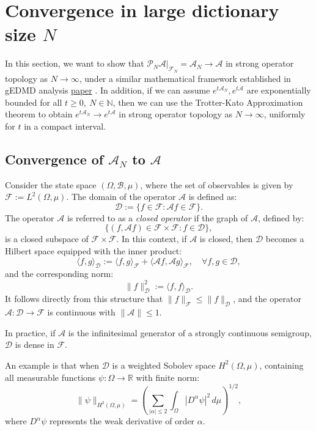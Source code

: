 \documentclass{article}[11]
\begin{document}
	\section{Convergence in large dictionary size $N$}
	In this section, we want to show that $\mathcal{P}_N\mathcal{A}|_{\mathcal{F}_N} = \mathcal{A}_N \to \mathcal{A}$ in strong operator topology as $N \to \infty$, under a similar mathematical framework established in gEDMD analysis \href{https://arxiv.org/abs/2405.00539}{paper} . In addition, if we can assume $e^{t\mathcal{A}_N}, e^{t\mathcal{A}}$ are exponentially bounded for all $t\geq 0, \ N\in\mathbb{N}$, then we can use the Trotter-Kato Approximation theorem to obtain $e^{t\mathcal{A}_N} \to e^{t\mathcal{A}}$ in strong operator topology as $N \to \infty$, uniformly for $t$ in a compact interval.
	
	
	\subsection{Convergence of \(\mathcal{A}_N\) to \(\mathcal{A}\)}
	
	Consider the state space \( (\Omega, \mathcal{B}, \mu) \), where the set of observables is given by \( \mathcal{F} := L^2(\Omega, \mu) \). The domain of the operator \( \mathcal{A} \) is defined as:
	\[
	\mathcal{D} := \{ f \in \mathcal{F} : \mathcal{A} f \in \mathcal{F} \}.
	\]
	The operator \( \mathcal{A} \) is referred to as a \textit{closed operator} if the graph of \( \mathcal{A} \), defined by:
	\[
	\{ (f, \mathcal{A} f) \in \mathcal{F} \times \mathcal{F} : f \in \mathcal{D} \},
	\]
	is a closed subspace of \( \mathcal{F} \times \mathcal{F} \). In this context, if \( \mathcal{A} \) is closed, then \( \mathcal{D} \) becomes a Hilbert space equipped with the inner product:
	\[
	\langle f, g \rangle_\mathcal{D} := \langle f, g \rangle_{\mathcal{F}} + \langle \mathcal{A} f, \mathcal{A} g \rangle_{\mathcal{F}}, \quad \forall f, g \in \mathcal{D},
	\]
	and the corresponding norm:
	\[
	\| f \|_\mathcal{D}^2 := \langle f, f \rangle_\mathcal{D}.
	\]
	It follows directly from this structure that \( \| f \|_{\mathcal{F}} \leq \| f \|_\mathcal{D} \), and the operator \( \mathcal{A} : \mathcal{D} \to \mathcal{F} \) is continuous with \( \| \mathcal{A} \| \leq 1 \).
	
	In practice, if \( \mathcal{A} \) is the infinitesimal generator of a strongly continuous semigroup, \( \mathcal{D} \) is dense in \( \mathcal{F} \).
	
	An example is that when \( \mathcal{D} \) is a weighted Sobolev space \( H^2(\Omega, \mu) \), containing all measurable functions \( \psi: \Omega \to \mathbb{R} \) with finite norm:
	\[
	\| \psi \|_{H^2(\Omega, \mu)} = \left( \sum_{|\alpha| \leq 2} \int_\Omega |D^\alpha \psi|^2 \, d\mu \right)^{1/2},
	\]
	where \( D^\alpha \psi \) represents the weak derivative of order \( \alpha \). 
	
\end{document}
